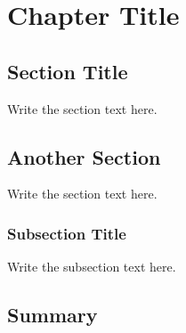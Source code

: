 \chapter{Chapter Title}
\label{ch:chapter-label}

\section{Section Title}
\label{sec:section-label}

Write the section text here.

\section{Another Section}
\label{sec:another-section}

Write the section text here.

\subsection{Subsection Title}
\label{subsec:subsection-label}

Write the subsection text here.

\section{Summary}
\label{sec:chapter-label-summary}